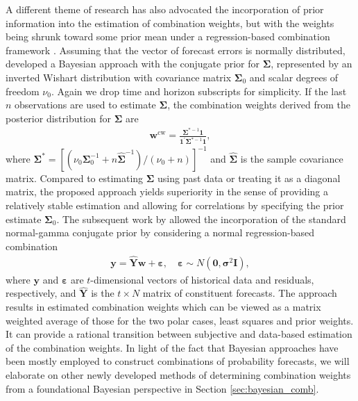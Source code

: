 \documentclass[11pt]{article}
\begin{document}
A different theme of research has also advocated the incorporation of prior information into the estimation of combination weights, but with the weights being shrunk toward some prior mean under a regression-based combination framework \citep{Newbold2002-wa}. Assuming that the vector of forecast errors is normally distributed, \citet{Clemen1986-pd} developed a Bayesian approach with the conjugate prior for $\boldsymbol{\Sigma}$, represented by an inverted Wishart distribution with covariance matrix $\boldsymbol{\Sigma}_{0}$ and scalar degrees of freedom $\nu_{0}$. Again we drop time and horizon subscripts for simplicity. If the last $n$ observations are used to estimate $\boldsymbol{\Sigma}$, the combination weights derived from the posterior distribution for $\boldsymbol{\Sigma}$ are
\begin{align*}
\boldsymbol{w}^{\text{cw}}=\frac{\boldsymbol{\Sigma}^{*-1}\boldsymbol{1}}{\boldsymbol{1}^{\prime} \boldsymbol{\Sigma}^{*-1} \boldsymbol{1}},
\end{align*}
where $\boldsymbol{\Sigma}^{*}=\left[\left(\nu_{0} \boldsymbol{\Sigma}_{0}^{-1}+n \hat{\boldsymbol{\Sigma}}^{-1}\right) /(\nu_{0}+n)\right]^{-1}$ and $\hat{\boldsymbol{\Sigma}}$ is the sample covariance matrix.
Compared to estimating $\boldsymbol{\Sigma}$ using past data or treating it as a diagonal matrix, the proposed approach yields superiority in the sense of providing a relatively stable estimation and allowing for correlations by specifying the prior estimate $\boldsymbol{\Sigma}_{0}$. The subsequent work by \citet{Diebold1990-fk} allowed the incorporation of the standard normal-gamma conjugate prior by considering a normal regression-based combination
\begin{align*}
\boldsymbol{y}=\hat{\boldsymbol{Y}} \boldsymbol{w}+\boldsymbol{\varepsilon}, \quad \boldsymbol{\varepsilon} \sim N\left(\boldsymbol{0}, \boldsymbol{\sigma}^{2} \boldsymbol{I}\right),
\end{align*}
where $\boldsymbol{y}$ and $\boldsymbol{\varepsilon}$ are $t$-dimensional vectors of historical data and residuals, respectively, and $\hat{\boldsymbol{Y}}$ is the $t \times N$ matrix of constituent forecasts. The approach results in estimated combination weights which can be viewed as a matrix weighted average of those for the two polar cases, least squares and prior weights. It can provide a rational transition between subjective and data-based estimation of the combination weights. In light of the fact that Bayesian approaches have been mostly employed to construct combinations of probability forecasts, we will elaborate on other newly developed methods of determining combination weights from a foundational Bayesian perspective in Section \ref{sec:bayesian_comb}.
\end{document}
